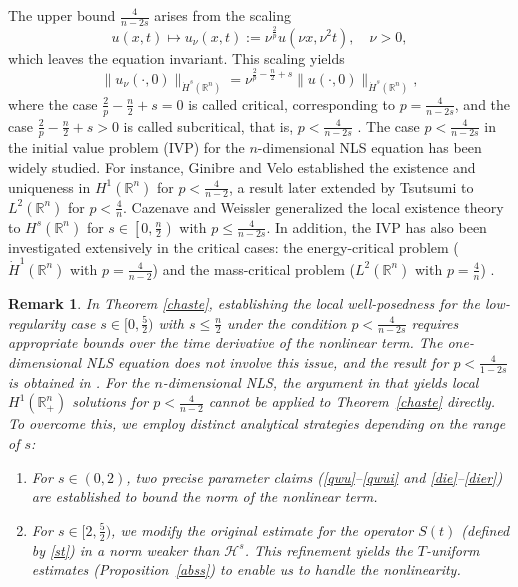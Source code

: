\documentclass[preprint,compress,12pt]{elsarticle}
\newtheorem{remark}[theorem]{Remark}
\numberwithin{equation}{section}
\begin{document}
The upper bound $\frac{4}{n-2s}$ arises from the scaling
\begin{equation*}
	u(x,t) \mapsto u_{\nu}(x,t):=\nu^{\frac{2}{p}}u(\nu x,\nu^{2}t),\quad \nu>0,
\end{equation*}
which leaves the equation invariant. This scaling yields
\begin{equation*}
	\|u_{\nu}(\cdot,0)\|_{\dot{H}^{s}(\mathbb{R}^{n})}=\nu^{\frac{2}{p}-\frac{n}{2}+s} \|u(\cdot,0)\|_{\dot{H}^{s}(\mathbb{R}^{n})},
\end{equation*}
where the case $\frac{2}{p}-\frac{n}{2}+s=0$ is called critical, corresponding to $p = \frac{4}{n-2s}$, and the case $\frac{2}{p}-\frac{n}{2}+s>0$ is called subcritical, that is, $p < \frac{4}{n-2s}$ \cite{LinPon}. The case $p<\frac{4}{n-2s}$   in the initial value problem (IVP) for the $n$-dimensional NLS equation has been widely studied. For instance, Ginibre and Velo \cite{Ginibre} established the existence and uniqueness in  $H^{1}(\mathbb{R}^{n})$ for $p<\frac{4}{n-2}$, a result later extended by Tsutsumi \cite{Tsutsumi} to $L^{2}(\mathbb{R}^{n})$ for $p<\frac{4}{n}$. Cazenave and Weissler \cite{Cazenave} generalized the local existence theory  to $H^{s}(\mathbb{R}^{n})$ for $s\in\left[0,\frac{n}{2}\right)$ with $p\leq \frac{4}{n-2s}$. In addition, the IVP has also been investigated extensively in the critical cases: the energy-critical problem ($\dot{H}^{1}(\mathbb{R}^{n})$ with  $p=\frac{4}{n-2}$) \cite{Bourgain, tyro, Ryckman Visan,Tao 2005,Visan 2007} and the mass-critical problem ($L^{2}(\mathbb{R}^{n})$ with  $p=\frac{4}{n}$)  \cite{cohesion,rookie,neophyte}.

\begin{remark}
In Theorem \ref{chaste}, establishing the local well-posedness for the low-regularity case $s\in[0,\frac{5}{2})$ with $s\leq\frac{n}{2}$ under the condition  $p<\frac{4}{n-2s}$ requires appropriate bounds over the time derivative of the nonlinear term.  The one-dimensional NLS equation does not involve this issue, and the result for $p<\frac{4}{1-2s}$ is obtained in \cite{chatter, figment}. For the $n$-dimensional NLS, the argument in \cite{facilitate} that yields local  $H^{1}(\mathbb{R}^{n}_{+})$ solutions for $p<\frac{4}{n-2}$ cannot be applied to Theorem~\ref{chaste} directly. To overcome this, we employ distinct analytical strategies depending on the range of $s$:
\begin{enumerate}[label=(\roman*)]
\item  For $s \in (0, 2)$, two precise parameter claims  (\eqref{qwu}--\eqref{qwui} and \eqref{die}--\eqref{dier}) are established to bound the norm of the nonlinear term.
\item For $s \in [2, \frac{5}{2})$, we modify the original estimate for the operator $S(t)$ (defined by \eqref{st}) in a norm weaker than $\mathcal{H}^s$. This  refinement yields the $T$-uniform estimates (Proposition~\ref{abss}) to enable us to handle the nonlinearity.
\end{enumerate}
\end{remark}
\end{document}
